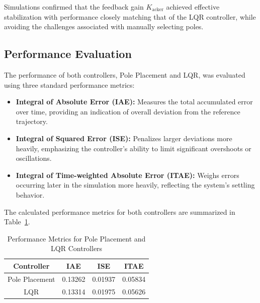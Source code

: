 \documentclass[conference]{IEEEtran}
\begin{document}
Simulations confirmed that the feedback gain \(K_{\text{acker}}\) achieved effective stabilization with performance closely matching that of the LQR controller, while avoiding the challenges associated with manually selecting poles.

\subsection{Performance Evaluation}
\label{subsec:control_performance}
The performance of both controllers, Pole Placement and LQR, was evaluated using three standard performance metrics:

\begin{itemize}
    \item \textbf{Integral of Absolute Error (IAE):} Measures the total accumulated error over time, providing an indication of overall deviation from the reference trajectory.
    \item \textbf{Integral of Squared Error (ISE):} Penalizes larger deviations more heavily, emphasizing the controller's ability to limit significant overshoots or oscillations.
    \item \textbf{Integral of Time-weighted Absolute Error (ITAE):} Weighs errors occurring later in the simulation more heavily, reflecting the system's settling behavior.
\end{itemize}

The calculated performance metrics for both controllers are summarized in Table~\ref{tab:performance_metrics}.

\begin{table}[H]
\centering
\caption{Performance Metrics for Pole Placement and LQR Controllers}
\label{tab:performance_metrics}
\begin{tabular}{|c|c|c|c|}
\hline
\textbf{Controller} & \textbf{IAE}   & \textbf{ISE}   & \textbf{ITAE}  \\ \hline
Pole Placement      & 0.13262        & 0.01937        & 0.05834        \\ \hline
LQR                 & 0.13314        & 0.01975        & 0.05626        \\ \hline
\end{tabular}
\end{table}
\end{document}

